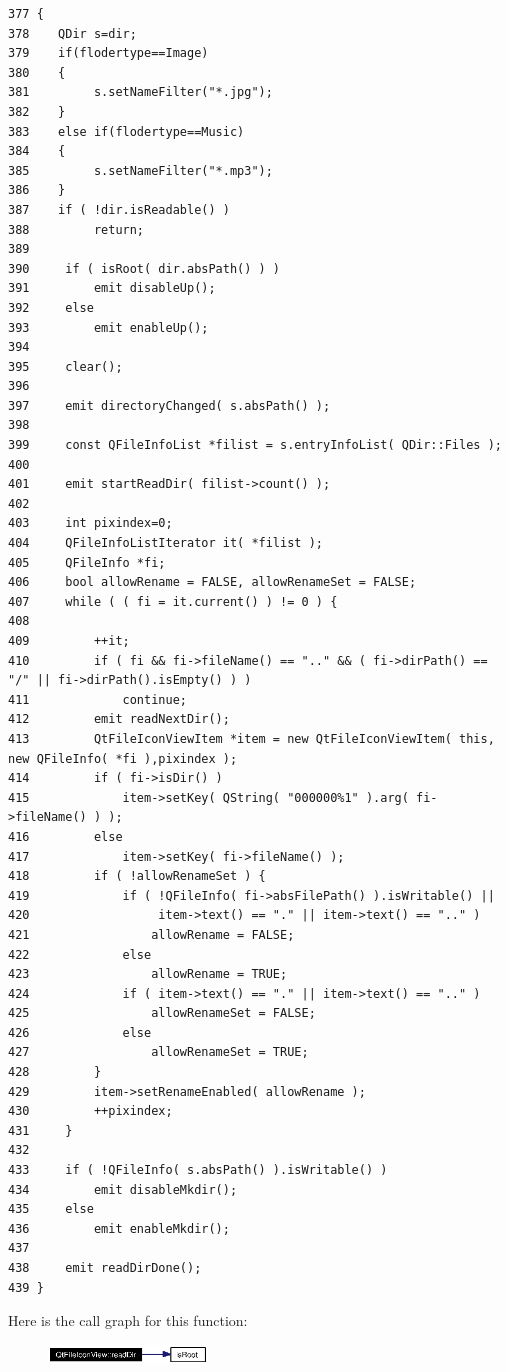 \footnotesize\begin{verbatim}377 {
378    QDir s=dir;
379    if(flodertype==Image)
380    {
381         s.setNameFilter("*.jpg");
382    }
383    else if(flodertype==Music)
384    {
385         s.setNameFilter("*.mp3");
386    }
387    if ( !dir.isReadable() )
388         return;
389 
390     if ( isRoot( dir.absPath() ) )
391         emit disableUp();
392     else
393         emit enableUp();
394 
395     clear();
396 
397     emit directoryChanged( s.absPath() );
398 
399     const QFileInfoList *filist = s.entryInfoList( QDir::Files );
400 
401     emit startReadDir( filist->count() );
402 
403     int pixindex=0;
404     QFileInfoListIterator it( *filist );
405     QFileInfo *fi;
406     bool allowRename = FALSE, allowRenameSet = FALSE;
407     while ( ( fi = it.current() ) != 0 ) {
408         
409         ++it;
410         if ( fi && fi->fileName() == ".." && ( fi->dirPath() == "/" || fi->dirPath().isEmpty() ) )
411             continue;
412         emit readNextDir();
413         QtFileIconViewItem *item = new QtFileIconViewItem( this, new QFileInfo( *fi ),pixindex );
414         if ( fi->isDir() )
415             item->setKey( QString( "000000%1" ).arg( fi->fileName() ) );
416         else
417             item->setKey( fi->fileName() );
418         if ( !allowRenameSet ) {
419             if ( !QFileInfo( fi->absFilePath() ).isWritable() ||
420                  item->text() == "." || item->text() == ".." )
421                 allowRename = FALSE;
422             else
423                 allowRename = TRUE;
424             if ( item->text() == "." || item->text() == ".." )
425                 allowRenameSet = FALSE;
426             else
427                 allowRenameSet = TRUE;
428         }
429         item->setRenameEnabled( allowRename );
430         ++pixindex;
431     }
432 
433     if ( !QFileInfo( s.absPath() ).isWritable() )
434         emit disableMkdir();
435     else
436         emit enableMkdir();
437 
438     emit readDirDone();
439 }
\end{verbatim}\normalsize 


Here is the call graph for this function:\begin{figure}[H]
\begin{center}
\leavevmode
\includegraphics[width=120pt]{classQtFileIconView_QtFileIconViewb0_cgraph}
\end{center}
\end{figure}
